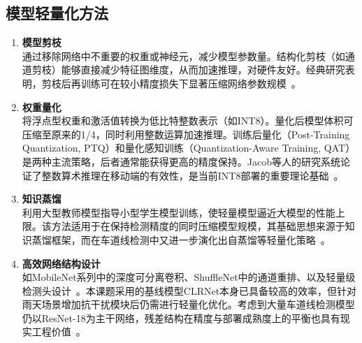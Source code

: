 \subsection{模型轻量化方法}
\begin{enumerate}[label=(\arabic*)]
	\item \textbf{模型剪枝} \\
	通过移除网络中不重要的权重或神经元，减少模型参数量。结构化剪枝（如通道剪枝）能够直接减少特征图维度，从而加速推理，对硬件友好。经典研究表明，剪枝后再训练可在较小精度损失下显著压缩网络参数规模~\cite{han2015pruning}。
	
	\item \textbf{权重量化} \\
	将浮点型权重和激活值转换为低比特整数表示（如INT8）。量化后模型体积可压缩至原来的1/4，同时利用整数运算加速推理。训练后量化（Post-Training Quantization, PTQ）和量化感知训练（Quantization-Aware Training, QAT）是两种主流策略，后者通常能获得更高的精度保持。Jacob等人的研究系统论证了整数算术推理在移动端的有效性，是当前INT8部署的重要理论基础~\cite{jacob2018quantization}。
	
	\item \textbf{知识蒸馏} \\
	利用大型教师模型指导小型学生模型训练，使轻量模型逼近大模型的性能上限。该方法适用于在保持检测精度的同时压缩模型规模，其基础思想来源于知识蒸馏框架，而在车道线检测中又进一步演化出自蒸馏等轻量化策略~\cite{hinton2015distilling,hou2019sad}。
	
	\item \textbf{高效网络结构设计} \\
	如MobileNet系列中的深度可分离卷积、ShuffleNet中的通道重排、以及轻量级检测头设计~\cite{howard2017mobilenets,sandler2018mobilenetv2,zhang2018shufflenet}。本课题采用的基线模型CLRNet本身已具备较高的效率，但针对雨天场景增加抗干扰模块后仍需进行轻量化优化。考虑到大量车道线检测模型仍以ResNet-18为主干网络，残差结构在精度与部署成熟度上的平衡也具有现实工程价值~\cite{he2016resnet}。
\end{enumerate}

